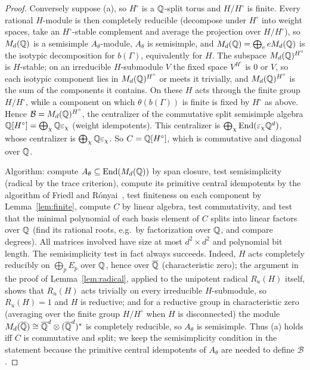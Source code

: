 \begin{proof}
Conversely suppose (a), so $H^\circ$ is a $\mathbb{Q}$-split torus and $H/H^\circ$ is finite. Every rational
$H$-module is then completely reducible (decompose under $H^\circ$ into weight spaces, take an
$H^\circ$-stable complement and average the projection over $H/H^\circ$), so $M_d(\mathbb{Q})$ is a semisimple
$A_\theta$-module, $A_\theta$ is semisimple, and $M_d(\mathbb{Q})=\bigoplus_eeM_d(\mathbb{Q})$ is the isotypic
decomposition for $b(\Gamma)$, equivalently for $H$. The subspace $M_d(\mathbb{Q})^{H^\circ}$ is $H$-stable;
on an irreducible $H$-submodule $V$ the fixed space $V^{H^\circ}$ is $0$ or $V$, so each isotypic
component lies in $M_d(\mathbb{Q})^{H^\circ}$ or meets it trivially, and $M_d(\mathbb{Q})^{H^\circ}$ is the sum of the
components it contains. On these $H$ acts through the finite group $H/H^\circ$, while a component
on which $\theta(b(\Gamma))$ is finite is fixed by $H^\circ$ as above. Hence
$\mathcal B=M_d(\mathbb{Q})^{H^\circ}$, the centralizer of the commutative split semisimple algebra
$\mathbb{Q}[H^\circ]=\bigoplus_\chi\mathbb{Q}\varepsilon_\chi$ (weight idempotents). This centralizer is
$\bigoplus_\chi\operatorname{End}(\varepsilon_\chi\mathbb{Q}^d)$, whose centralizer is
$\bigoplus_\chi\mathbb{Q}\varepsilon_\chi$. So $C=\mathbb{Q}[H^\circ]$, which is commutative and diagonal over $\mathbb{Q}$.

Algorithm: compute $A_\theta\subseteq\operatorname{End}(M_d(\mathbb{Q}))$ by span closure, test
semisimplicity (radical by the trace criterion), compute its primitive central idempotents by the
algorithm of Friedl and R\'onyai~\cite{FR85}, test finiteness on each component by
Lemma~\ref{lem:finite}, compute $C$ by linear algebra, test commutativity, and test that the minimal
polynomial of each basis element of $C$ splits into linear factors over $\mathbb{Q}$ (find its rational roots,
e.g.\ by factorization over $\mathbb{Q}$, and compare degrees). All matrices involved have size at most
$d^2\times d^2$ and polynomial bit length. The semisimplicity test in fact always succeeds. Indeed, $H$ acts
completely reducibly on $\bigoplus_pE_p$ over $\mathbb{Q}$, hence over $\overline{\mathbb{Q}}$ (characteristic zero); the argument
in the proof of Lemma~\ref{lem:radical}, applied to the unipotent radical $R_u(H)$ itself, shows that
$R_u(H)$ acts trivially on every irreducible $H$-submodule, so $R_u(H)=1$ and $H$ is reductive; and for
a reductive group in characteristic zero (averaging over the finite group $H/H^\circ$ when $H$ is
disconnected) the module $M_d(\overline{\mathbb{Q}})\cong\overline{\mathbb{Q}}^d\otimes(\overline{\mathbb{Q}}^d)^*$ is completely reducible, so $A_\theta$ is
semisimple. Thus (a) holds iff $C$ is commutative and split; we keep the semisimplicity condition in
the statement because the primitive central idempotents of $A_\theta$ are needed to define
$\mathcal B$.
\end{proof}

